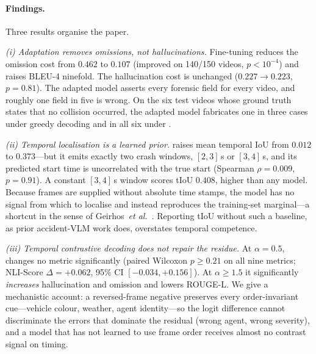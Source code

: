 \paragraph{Findings.}
Three results organise the paper.

\emph{(i) Adaptation removes omissions, not hallucinations.}
Fine-tuning reduces the omission cost from $0.462$ to $0.107$ (improved on 140/150 videos, $p<10^{-4}$) and raises BLEU-4 ninefold.
The hallucination cost is unchanged ($0.227\to0.223$, $p=0.81$).
The adapted model asserts every forensic field for every video, and roughly one field in five is wrong.
On the six test videos whose ground truth states that no collision occurred, the adapted model fabricates one in three cases under greedy decoding and in all six under \tcd.

\emph{(ii) Temporal localisation is a learned prior.}
\crashlogic{} raises mean temporal IoU from $0.012$ to $0.373$---but it emits exactly two crash windows, $[2,3]$\,s or $[3,4]$\,s, and its predicted start time is uncorrelated with the true start (Spearman $\rho{=}0.009$, $p{=}0.91$).
A constant $[3,4]$\,s window scores tIoU $0.408$, higher than any model.
Because frames are supplied without absolute time stamps, the model has no signal from which to localise and instead reproduces the training-set marginal---a shortcut in the sense of Geirhos~\emph{et al.}~\cite{geirhos2020shortcut}.
Reporting tIoU without such a baseline, as prior accident-VLM work does, overstates temporal competence.

\emph{(iii) Temporal contrastive decoding does not repair the residue.}
At $\alpha{=}0.5$, \tcd{} changes no metric significantly (paired Wilcoxon $p\geq0.21$ on all nine metrics; NLI-Score $\Delta{=}{+}0.062$, 95\% CI $[-0.034,+0.156]$).
At $\alpha\geq1.5$ it significantly \emph{increases} hallucination and omission and lowers ROUGE-L.
We give a mechanistic account: a reversed-frame negative preserves every order-invariant cue---vehicle colour, weather, agent identity---so the logit difference cannot discriminate the errors that dominate the residual (wrong agent, wrong severity), and a model that has not learned to use frame order receives almost no contrast signal on timing.

